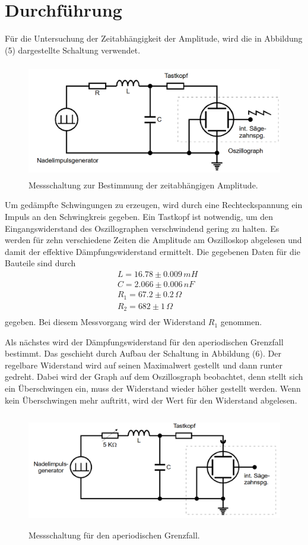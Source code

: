 \section{Durchführung}
\label{sec:Durchführung}

Für die Untersuchung der Zeitabhängigkeit der Amplitude, wird die in Abbildung (5) dargestellte Schaltung verwendet.

\begin{figure}[H]
  \centering
  \includegraphics[height=5cm]{Schaltung1.png}
  \caption{Messschaltung zur Bestimmung der zeitabhängigen Amplitude. \cite[S. 11]{kent}}
\end{figure}
\noindent Um gedämpfte Schwingungen zu erzeugen, wird durch eine Rechteckspannung ein Impuls an den Schwingkreis gegeben.
Ein Tastkopf ist notwendig, um den Eingangswiderstand des Oszillographen verschwindend gering zu halten. 
Es werden für zehn verschiedene Zeiten die Amplitude am Oszilloskop abgelesen und damit der effektive Dämpfungswiderstand ermittelt.
Die gegebenen Daten für die Bauteile sind durch 
\begin{align*}
&L = 16.78 \pm 0.009 \, mH \\
&C = 2.066 \pm 0.006 \, nF \\
&R_1 = 67.2 \pm 0.2 \, \Omega \\
&R_2 = 682 \pm 1 \, \Omega \\
\end{align*}
gegeben. Bei diesem Messvorgang wird der Widerstand $R_1$ genommen.


\noindent Als nächstes wird der Dämpfungswiderstand für den aperiodischen Grenzfall bestimmt. Das geschieht durch Aufbau der Schaltung in Abbildung (6).
Der regelbare Widerstand wird auf seinen Maximalwert gestellt und dann runter gedreht. Dabei wird der Graph auf dem Oszillosgraph 
beobachtet, denn stellt sich ein Überschwingen ein, muss der Widerstand wieder höher gestellt werden. Wenn kein Überschwingen mehr
auftritt, wird der Wert für den Widerstand abgelesen.
\begin{figure}[H]
  \centering
  \includegraphics[height=5cm]{Schaltung2.png}
  \caption{Messschaltung für den aperiodischen Grenzfall. \cite[S. 12]{kent}}
\end{figure}

